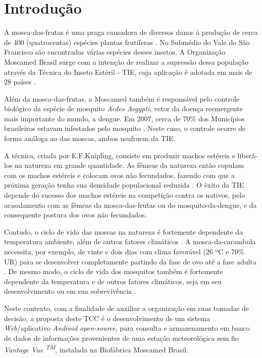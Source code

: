 \chapter{Introdução}

A mosca-das-frutas é uma praga causadora de diversos danos à produção de cerca de 400 (quatrocentas) espécies plantas frutíferas \cite{medfly}. No Submédio do Vale do São Francisco são encontradas várias espécies desses insetos. A Organização Moscamed Brasil surge com a intenção de realizar a supressão dessa população através da Técnica do Inseto Estéril - TIE, cuja aplicação é adotada em mais de 28 países \cite{MOSCAMEDINST2003}. 

Além da mosca-das-frutas, a Moscamed também é responsável pelo controle biológico da espécie de mosquito \textit{Aedes Aegypti}, vetor da doença reemergente mais importante do mundo, a dengue. Em 2007, cerca de 70\% dos Municípios brasileiros estavam infestados pelo mosquito \cite{BRAGA2007}. Neste caso, o controle ocorre de forma análoga ao das moscas, ambos usufruem da TIE.

A técnica, criada por E.F.Knipling, consiste em produzir machos estéreis e liberá-los na natureza em grande quantidade. As fêmeas da natureza então copulam com os machos estéreis e colocam ovos não fecundados, fazendo com que a próxima geração tenha sua densidade populacional reduzida \cite{paranhos2008moscas}. O êxito da TIE depende do sucesso dos machos estéreis na competição contra os nativos, pelo acasalamento com as fêmeas da mosca-das-frutas ou do mosquito-da-dengue, e da consequente postura dos ovos não fecundados.

Contudo, o ciclo de vida das moscas na natureza é fortemente dependente da temperatura ambiente, além de outros fatores climáticos \cite{raga2000manejo}. A mosca-da-carambola necessita, por exemplo, de vinte e dois dias com clima favorável (26 ºC e 70\% UR) para se desenvolver completamente partindo da fase de ovo até a fase adulta \cite{malavasi2000moscas}. De mesmo modo, o ciclo de vida dos mosquitos também é fortemente dependente da temperatura e de outros fatores climáticos, seja em seu desenvolvimento ou em sua sobrevivência \cite{hopp2001global, ribeiro2006associaccao}.

Neste contexto, com a finalidade de auxiliar a organização em suas tomadas de decisão, a proposta deste TCC é o desenvolvimento de um sistema \textit{Web}/aplicativo \textit{Android open-source}, para consulta e armazenamento em banco de dados de informações provenientes de uma estação meteorológica sem fio \textit{Vantage Vue \textsuperscript{TM}}, instalada na Biofábrica Moscamed Brasil.

